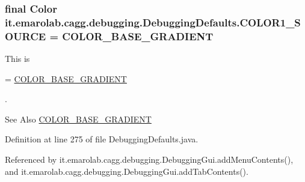 \hypertarget{classit_1_1emarolab_1_1cagg_1_1debugging_1_1DebuggingDefaults_a1ca8258073b237027e0c9b3499c239cf}{
\subsubsection[{C\-O\-L\-O\-R1\-\_\-\-S\-O\-U\-R\-C\-E}]{\setlength{\rightskip}{0pt plus 5cm}final Color it.\-emarolab.\-cagg.\-debugging.\-Debugging\-Defaults.\-C\-O\-L\-O\-R1\-\_\-\-S\-O\-U\-R\-C\-E = {\bf C\-O\-L\-O\-R\-\_\-\-B\-A\-S\-E\-\_\-\-G\-R\-A\-D\-I\-E\-N\-T}\hspace{0.3cm}{\ttfamily [static]}}}\label{classit_1_1emarolab_1_1cagg_1_1debugging_1_1DebuggingDefaults_a1ca8258073b237027e0c9b3499c239cf}
This is
\begin{DoxyCode}
= \hyperlink{classit_1_1emarolab_1_1cagg_1_1debugging_1_1DebuggingDefaults_a17491ab8ed655381e8f8cc34e9d3b670}{COLOR\_BASE\_GRADIENT} 
\end{DoxyCode}
 . \begin{DoxySeeAlso}{See Also}
\hyperlink{classit_1_1emarolab_1_1cagg_1_1debugging_1_1DebuggingDefaults_a17491ab8ed655381e8f8cc34e9d3b670}{C\-O\-L\-O\-R\-\_\-\-B\-A\-S\-E\-\_\-\-G\-R\-A\-D\-I\-E\-N\-T} 
\end{DoxySeeAlso}


Definition at line 275 of file Debugging\-Defaults.\-java.



Referenced by it.\-emarolab.\-cagg.\-debugging.\-Debugging\-Gui.\-add\-Menu\-Contents(), and it.\-emarolab.\-cagg.\-debugging.\-Debugging\-Gui.\-add\-Tab\-Contents().


